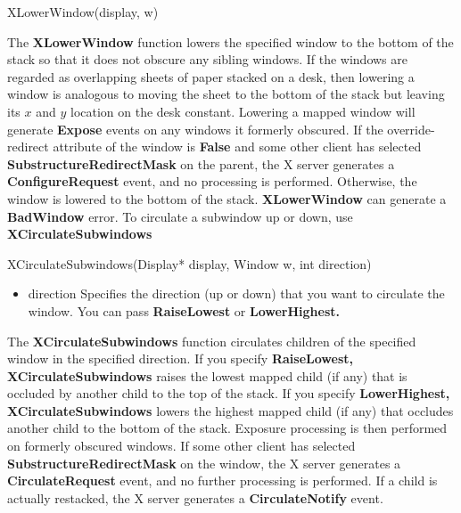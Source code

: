 \documentclass{report}
\begin{document}
\begin{itemize}
            \bigbreak \noindent 
            \begin{cppcode}
                XLowerWindow(display, w)
            \end{cppcode}
            \bigbreak \noindent 
            The \textbf{XLowerWindow} function lowers the specified window to the bottom of the stack so that it does not obscure any sibling windows. If the windows are regarded as overlapping sheets of paper stacked on a desk, then lowering a window is analogous to moving the sheet to the bottom of the stack but leaving its $x$ and $y$ location on the desk constant. Lowering a mapped window will generate \textbf{Expose} events on any windows it formerly obscured.
            \bigbreak \noindent 
            If the override-redirect attribute of the window is \textbf{False} and some other client has selected \textbf{SubstructureRedirectMask} on the parent, the X server generates a \textbf{ConfigureRequest} event, and no processing is performed. Otherwise, the window is lowered to the bottom of the stack.
            \bigbreak \noindent 
            \textbf{XLowerWindow} can generate a \textbf{BadWindow} error.
            \bigbreak \noindent 
            To circulate a subwindow up or down, use \textbf{XCirculateSubwindows}
            \bigbreak \noindent 
            \begin{cppcode}
                XCirculateSubwindows(Display* display, Window w, int direction)
            \end{cppcode}
            \bigbreak \noindent
            \begin{itemize}
                \item direction Specifies the direction (up or down) that you want to circulate the window. You can pass \textbf{RaiseLowest} or \textbf{LowerHighest.}
            \end{itemize}
            The \textbf{XCirculateSubwindows} function circulates children of the specified window in the specified direction. If you specify \textbf{RaiseLowest,} \textbf{XCirculateSubwindows} raises the lowest mapped child (if any) that is occluded by another child to the top of the stack. If you specify \textbf{LowerHighest,} \textbf{XCirculateSubwindows} lowers the highest mapped child (if any) that occludes another child to the bottom of the stack. Exposure processing is then performed on formerly obscured windows. If some other client has selected \textbf{SubstructureRedirectMask} on the window, the X server generates a \textbf{CirculateRequest} event, and no further processing is performed. If a child is actually restacked, the X server generates a \textbf{CirculateNotify} event.

\end{itemize}
\end{document}

